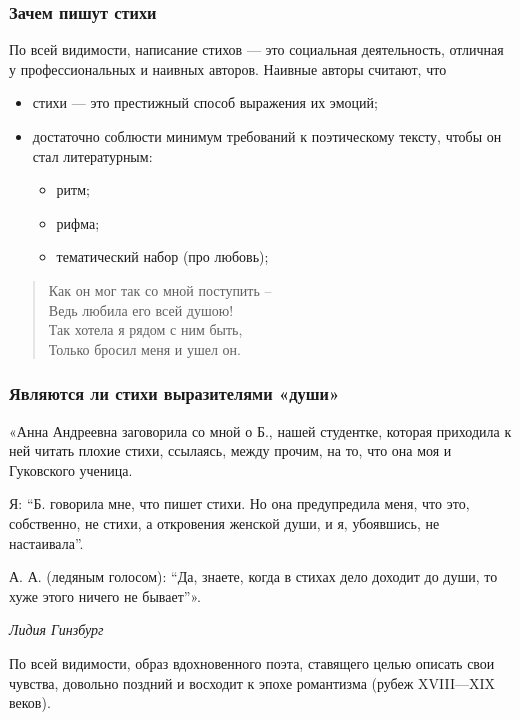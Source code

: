 \documentclass{beamer}
\begin{document}
\begin{frame}
\frametitle{Зачем пишут стихи}
По всей видимости, написание стихов — это социальная деятельность, отличная у профессиональных и наивных авторов.
Наивные авторы считают, что
\begin{itemize}
\item стихи — это престижный способ выражения их эмоций;
\item достаточно соблюсти минимум требований к поэтическому тексту, чтобы он стал литературным:
\begin{itemize}
\item ритм;
\item рифма;
\item тематический набор (про любовь);
\end{itemize}
\end{itemize}

\begin{verse}
Как он мог так со мной поступить –\\
Ведь любила его всей душою!\\
Так хотела я рядом с ним быть,\\
Только бросил меня и ушел он.\\
\end{verse}

\end{frame}


\begin{frame}
\frametitle{Являются ли стихи выразителями «души»}
«Анна Андреевна заговорила со мной о Б., нашей студентке, которая приходила к ней читать плохие стихи, ссылаясь, между прочим, на то, что она моя и Гуковского ученица.

Я: “Б. говорила мне, что пишет стихи. Но она предупредила меня, что это, собственно, не стихи, а откровения женской души, и я, убоявшись, не настаивала”.

А. А. (ледяным голосом): “Да, знаете, когда в стихах дело доходит до души, то хуже этого ничего не бывает”».

\textit{Лидия Гинзбург}

\begin{flushleft}
По всей видимости, образ вдохновенного поэта, ставящего целью описать свои чувства, довольно поздний и восходит к эпохе романтизма (рубеж XVIII—XIX веков).
\end{flushleft}


\end{frame}
\end{document}
